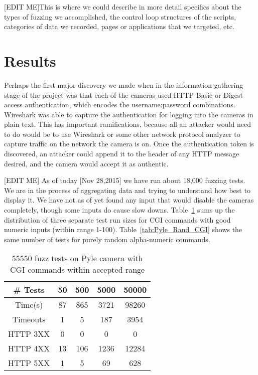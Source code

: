 \documentclass[letterpaper,twocolumn,10pt]{article}
\begin{document}
 
[EDIT ME]This is where we could describe in more detail specifics about the types of fuzzing we accomplished, the control loop structures of the scripts, categories of data we recorded, pages or applications that we targeted, etc.




\section{Results}


Perhaps the first major discovery we made when in the information-gathering stage of the project was that each of the cameras used HTTP Basic or Digest access authentication, which encodes the username:password combinations. Wireshark was able to capture the authentication for logging into the cameras in plain text. This has important ramifications, because all an attacker would need to do would be to use Wireshark or some other network protocol analyzer to capture traffic on the network the camera is on. Once the authentication token is discovered, an attacker could append it to the header of any HTTP message desired, and the camera would accept it as authentic. 

[EDIT ME]
As of today [Nov 28,2015] we have run about 18,000 fuzzing tests. We are in the process of aggregating data and trying to understand how best to display it. We have not as of yet found any input that would disable the cameras completely, though some inputs do cause slow downs. Table~\ref{tab:Pyle_Good_CGI} sums up the distribution of three separate test run sizes for CGI commands with good numeric inputs (within range 1-100). Table~\ref{tab:Pyle_Rand_CGI} shows the same number of tests for purely random alpha-numeric commands.

\begin{table}
\centering
	\begin{tabular}{ |c|c|c|c|c| }
		\hline
		\# Tests & 50 & 500 & 5000 & 50000 \\
		\hline
		\hline
		Time(s) & 87 & 865 & 3721 & 98260\\
		Timeouts & 1 & 5 & 187 & 3954 \\
		HTTP 3XX & 0 & 0 & 0 & 0\\
		HTTP 4XX & 13 & 106 & 1236 & 12284\\
		HTTP 5XX & 1 & 5 & 69 & 628\\
		\hline
	\end{tabular}
	\caption{55550 fuzz tests on Pyle camera with CGI commands within accepted range}
	\label{tab:Pyle_Good_CGI} 
\end{table}
\end{document}
